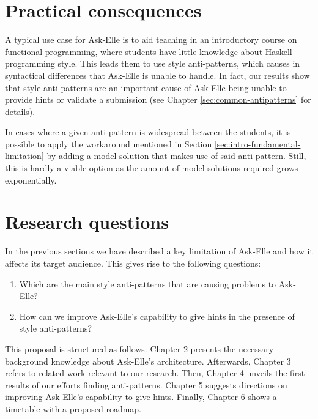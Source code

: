 \section{Practical consequences}

A typical use case for Ask-Elle is to aid teaching in an introductory course on functional programming, where students have little knowledge about Haskell programming style. This leads them to use style anti-patterns, which causes in syntactical differences that Ask-Elle is unable to handle. In fact, our results show that style anti-patterns are an important cause of Ask-Elle being unable to provide hints or validate a submission (see Chapter \ref{sec:common-antipatterns} for details).

In cases where a given anti-pattern is widespread between the students, it is possible to apply the workaround mentioned in Section \ref{sec:intro-fundamental-limitation} by adding a model solution that makes use of said anti-pattern. Still, this is hardly a viable option as the amount of model solutions required grows exponentially.

\section{Research questions}

In the previous sections we have described a key limitation of Ask-Elle and how it affects its target audience. This gives rise to the following questions:

\begin{enumerate}
    \item Which are the main style anti-patterns that are causing problems to Ask-Elle?
    \item How can we improve Ask-Elle's capability to give hints in the presence of style anti-patterns?
\end{enumerate}

This proposal is structured as follows. Chapter 2 presents the necessary background knowledge about Ask-Elle's architecture. Afterwards, Chapter 3 refers to related work relevant to our research. Then, Chapter 4 unveils the first results of our efforts finding anti-patterns. Chapter 5 suggests directions on improving Ask-Elle's capability to give hints. Finally, Chapter 6 shows a timetable with a proposed roadmap.
